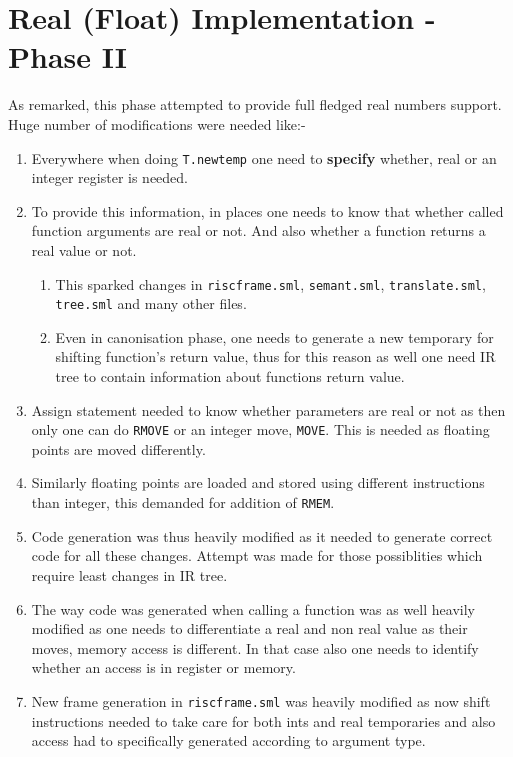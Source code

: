 \section{Real (Float) Implementation - Phase II}

As remarked, this phase attempted to provide full fledged real numbers support. Huge number of modifications were needed like:-

\begin{enumerate}
	\item Everywhere when doing \texttt{T.newtemp} one need to \textbf{specify} whether, real or an integer register is needed.
	\item To provide this information, in places one needs to know that whether called function arguments are real or not. And also whether a function returns a real value or not.
	      \begin{enumerate}
		      \item This sparked changes in \texttt{riscframe.sml}, \texttt{semant.sml}, \texttt{translate.sml}, \texttt{tree.sml} and many other files.
		      \item Even in canonisation phase, one needs to generate a new temporary for shifting function's return value, thus for this reason as well one need IR tree to contain information about functions return value.
	      \end{enumerate}
	\item Assign statement needed to know whether parameters are real or not as then only one can do \texttt{RMOVE} or an integer move, \texttt{MOVE}. This is needed as floating points are moved differently.
	\item Similarly floating points are loaded and stored using different instructions than integer, this demanded for addition of \texttt{RMEM}.
	\item Code generation was thus heavily modified as it needed to generate correct code for all these changes. Attempt was made for those possiblities which require least changes in IR tree.
	\item The way code was generated when calling a function was as well heavily modified as one needs to differentiate a real and non real value as their moves, memory access is different. In that case also one needs to identify whether an access is in register or memory.
	\item New frame generation in \texttt{riscframe.sml} was heavily modified as now shift instructions needed to take care for both ints and real temporaries and also access had to specifically generated according to argument type.

\end{enumerate}
